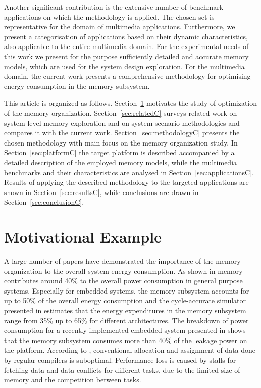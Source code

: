 Another significant contribution is the extensive number of benchmark applications on which the methodology is applied.
The chosen set is representative for the domain of multimedia applications.
Furthermore, we present a categorisation of applications based on their dynamic characteristics, also applicable to the entire multimedia domain. 
For the experimental needs of this work we present for the purpose sufficiently detailed and accurate  memory models, which are used for the system design exploration.
For the multimedia domain, the current work presents a comprehensive methodology for optimising energy consumption in the memory subsystem.

This article is organized as follows. 
Section~\ref{sec:motivationC} motivates the study of optimization of the memory organization. 
Section~\ref{sec:relatedC} surveys related work on system level memory exploration and on system scenario methodologies and compares it with the current work. 
Section~\ref{sec:methodologyC} presents the chosen methodology with main focus on the memory organization study. 
In Section~\ref{sec:platformC} the target platform is described accompanied by a detailed description of the employed memory models, while the multimedia benchmarks and their characteristics are analysed in Section~\ref{sec:applicationsC}. 
Results of applying the described methodology to the targeted applications are shown in Section~\ref{sec:resultsC}, while conclusions are drawn in Section~\ref{sec:conclusionC}. 

\section{Motivational Example}
\label{sec:motivationC}

A large number of papers have demonstrated the importance of the memory organization to the overall system energy consumption. 
As shown in \cite{Gonzalez1996} memory contributes around 40\% to the overall power consumption in general purpose systems. 
Especially for embedded systems, the memory subsystem accounts for up to 50\% of the overall energy consumption \cite{Che09} and the cycle-accurate simulator presented in \cite{Ben99} estimates that the energy expenditures in the memory subsystem range from 35\% up to 65\% for different architectures. 
The breakdown of power consumption for a recently implemented embedded system presented in \cite{Hul11} shows that the memory subsystem consumes more than 40\% of the leakage power on the platform. 
According to \cite{tcm}, conventional allocation and assignment of data done by regular compilers is suboptimal. 
Performance loss is caused by stalls for fetching data and data conflicts for different tasks, due to the limited size of memory and the competition between tasks. 

